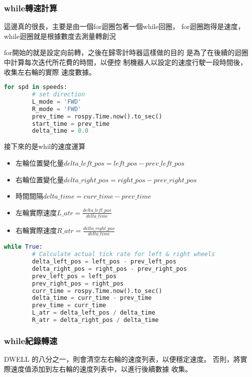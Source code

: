 \subsubsection{while轉速計算}
這邊真的很長，主要是由一個for迴圈包著一個while回圈，
for迴圈跑得是速度，while迴圈就是根據數度去測量轉創況

for開始的就是設定向前轉，之後在歸零計時器這樣做的目的
是為了在後續的迴圈中計算每次迭代所花費的時間，以便控
制機器人以設定的速度行駛一段時間後，收集左右輪的實際
速度數據。


\begin{lstlisting}[language=Python, caption=whil之前的準備]
    for spd in speeds:
        # set direction
        L_mode = 'FWD'
        R_mode = 'FWD'
        prev_time = rospy.Time.now().to_sec()
        start_time = prev_time
        delta_time = 0.0
\end{lstlisting}
接下來的是whil的速度運算
\begin{itemize}
    \item 左輪位置變化量${delta\_left\_pos} = {left\_pos} - {prev\_left\_pos}$
    \item 右輪位置變化量${delta\_right\_pos} = {right\_pos} - {prev\_right\_pos}$
    \item 時間間隔${delta\_time} = {curr\_time} - {prev\_time}$
    \item 左輪實際速度${L\_atr} = \frac{{delta\_left\_pos}}{{delta\_time}}$
    \item 右輪實際速度${R\_atr} = \frac{{delta\_right\_pos}}{{delta\_time}}$
\end{itemize}
\begin{lstlisting}[language=Python, caption=轉速運算]
while True:
        # Calculate actual tick rate for left & right wheels
        delta_left_pos = left_pos - prev_left_pos
        delta_right_pos = right_pos - prev_right_pos
        prev_left_pos = left_pos
        prev_right_pos = right_pos
        curr_time = rospy.Time.now().to_sec()
        delta_time = curr_time - prev_time
        prev_time = curr_time
        L_atr = delta_left_pos / delta_time
        R_atr = delta_right_pos / delta_time
\end{lstlisting}

\subsubsection{while紀錄轉速}
 DWELL 的八分之一，則會清空左右輪的速度列表，以便穩定速度。
 否則，將實際速度值添加到左右輪的速度列表中，以進行後續數據
 收集。

